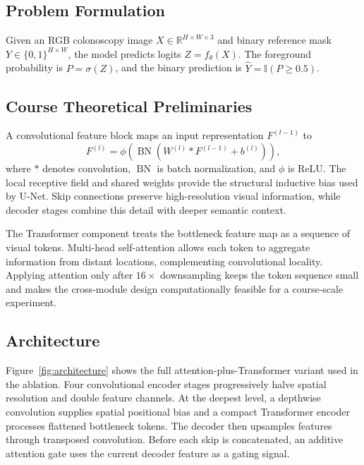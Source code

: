 \documentclass[a4paper,10pt]{article}
\begin{document}
\subsection{Problem Formulation}

Given an RGB colonoscopy image $X\in\mathbb{R}^{H\times W\times 3}$ and binary reference mask $Y\in\{0,1\}^{H\times W}$, the model predicts logits $Z=f_{\theta}(X)$. The foreground probability is $P=\sigma(Z)$, and the binary prediction is $\hat{Y}=\mathbb{I}(P\geq 0.5)$.

\subsection{Course Theoretical Preliminaries}

A convolutional feature block maps an input representation $F^{(l-1)}$ to
\begin{equation}
F^{(l)}=\phi\!\left(\operatorname{BN}\!\left(W^{(l)}*F^{(l-1)}+b^{(l)}\right)\right),
\end{equation}
where $*$ denotes convolution, $\operatorname{BN}$ is batch normalization, and $\phi$ is ReLU. The local receptive field and shared weights provide the structural inductive bias used by U-Net. Skip connections preserve high-resolution visual information, while decoder stages combine this detail with deeper semantic context.

The Transformer component treats the bottleneck feature map as a sequence of visual tokens. Multi-head self-attention allows each token to aggregate information from distant locations, complementing convolutional locality. Applying attention only after $16\times$ downsampling keeps the token sequence small and makes the cross-module design computationally feasible for a course-scale experiment.


\subsection{Architecture}

Figure~\ref{fig:architecture} shows the full attention-plus-Transformer variant used in the ablation. Four convolutional encoder stages progressively halve spatial resolution and double feature channels. At the deepest level, a depthwise convolution supplies spatial positional bias and a compact Transformer encoder processes flattened bottleneck tokens. The decoder then upsamples features through transposed convolution. Before each skip is concatenated, an additive attention gate uses the current decoder feature as a gating signal.
\end{document}
